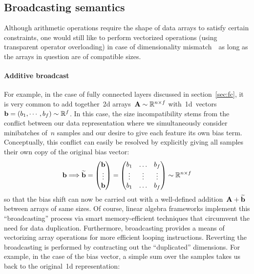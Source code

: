 \documentclass{article}
\begin{document}
\begin{appendices}
\section{Broadcasting semantics}
\label{appendix::broadcast}

\noindent Although arithmetic operations require the shape of data arrays to satisfy certain constraints, one would still like to perform vectorized operations (using transparent operator overloading) in case of dimensionality mismatch~\textemdash~as long as the arrays in question are of compatible sizes.

\paragraph{Additive broadcast} For example, in the case of fully connected layers discussed in section~\ref{sec:fc}, it is very common to add together~2d arrays~${\bf A} \sim \mathbb{R}^{n\times f}$ with~1d~vectors~${\bf b} = (b_1 , \cdots , b_f ) \sim \mathbb{R}^f$.  In this case, the size incompatibility stems from the conflict between our data representation where we simultaneously consider minibatches of~$n$ samples and our desire to give each feature its own bias term.  Conceptually, this conflict can easily be resolved by explicitly giving all samples their own copy of the original bias vector:
\begin{equation*}
{\bf b}  \Longrightarrow \widetilde{\bf b} = \left(
\begin{matrix}
   {\bf b} \\
   \vdots \\
   {\bf b}
\end{matrix}
\right) = \left(
\begin{matrix}
    b_1 & \dots & b_f \\
    \vdots & \vdots & \vdots \\
    b_1 & \dots & b_f
\end{matrix}
\right) \sim \mathbb{R}^{n\times f}
\end{equation*}
so that the bias shift can now be carried out with a well-defined addition~${\bf A} + \widetilde{\bf b}$ between arrays of same sizes. Of course, linear algebra frameworks implement this ``broadcasting'' process via smart memory-efficient techniques that circumvent the need for data duplication.  Furthermore, broadcasting provides a means of vectorizing array operations for more efficient looping instructions.  Reverting the broadcasting is performed by contracting out the ``duplicated'' dimensions.  For example, in the case of the bias vector, a simple sum over the samples takes us back to the original~1d representation:

\end{appendices}
\end{document}

